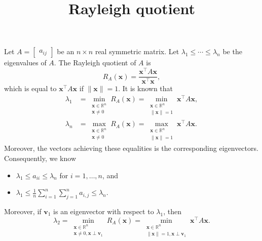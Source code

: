 \documentclass{article}
\title{Rayleigh quotient}
\date{\vspace{-1cm}}
\newcommand{\trans}{^\top}
\newcommand{\bx}{\mathbf{x}}
\newcommand{\bv}{\mathbf{v}}
\theoremstyle{definition}
\begin{document}
\maketitle
\large

Let $A = \begin{bmatrix} a_{ij} \end{bmatrix}$ be an $n\times n$ real symmetric matrix.  Let $\lambda_1 \leq \cdots \leq \lambda_n$ be the eigenvalues of $A$.  The Rayleigh quotient of $A$ is 
\[R_A(\bx) = \frac{\bx\trans A\bx}{\bx\trans\bx},\]
which is equal to $\bx\trans A\bx$ if $\|\bx\| = 1$.  It is known that 
\[\begin{aligned}
\lambda_1 &= \min_{\substack{\bx\in\mathbb{R}^n\\\bx\neq 0}}R_A(\bx) = 
\min_{\substack{\bx\in\mathbb{R}^n\\\|\bx\| = 1}}\bx\trans A\bx, \\
\lambda_n &= \max_{\substack{\bx\in\mathbb{R}^n\\\bx\neq 0}}R_A(\bx) = 
\max_{\substack{\bx\in\mathbb{R}^n\\\|\bx\| = 1}}\bx\trans A\bx. 
\end{aligned}\]
Moreover, the vectors achieving these equalities is the corresponding eigenvectors.
Consequently, we know 
\begin{itemize}
\item $\lambda_1 \leq a_{ii} \leq \lambda_n$ for $i = 1, \ldots, n$, and 
\item $\lambda_1 \leq \frac{1}{n}\sum_{i=1}^n\sum_{j=1}^n a_{i,j} \leq \lambda_n$.
\end{itemize}

Moreover, if $\bv_1$ is an eigenvector with respect to $\lambda_1$, then 
\[\lambda_2 = \min_{\substack{\bx\in\mathbb{R}^n\\\bx\neq 0, \bx\perp\bv_1}}R_A(\bx) = 
\min_{\substack{\bx\in\mathbb{R}^n\\\|\bx\| = 1, \bx\perp\bv_1}}\bx\trans A\bx.\]
  
\end{document}
